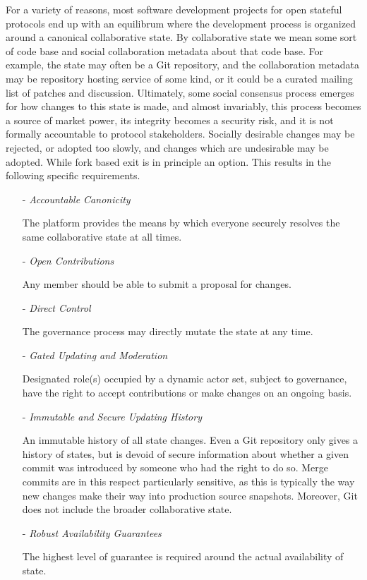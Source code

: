 \documentclass{article}
\begin{document}
For a variety of reasons, most software development projects for open stateful protocols end up with an equilibrum where the development process is organized around a canonical collaborative state. By collaborative state we mean some sort of code base and social collaboration metadata about that code base. For example, the state may often be a Git repository, and the collaboration metadata may be repository hosting service of some kind, or it could be a curated mailing list of patches and discussion. Ultimately, some social consensus process emerges for how changes to this state is made, and almost invariably, this process becomes a source of market power, its integrity becomes a security risk, and it is not formally accountable to protocol stakeholders. Socially desirable changes may be rejected, or adopted too slowly, and changes which are undesirable may be adopted. While fork based exit is in principle an option. This results in the following specific requirements.

\begin{enumerate}

    \item[-] \textit{Accountable Canonicity}

    The platform provides the means by which everyone securely resolves the same collaborative state at all times.

    \item[-] \textit{Open Contributions}

    Any member should be able to submit a proposal for changes.

    \item[-] \textit{Direct Control}

    The governance process may directly mutate the state at any time.

    \item[-] \textit{Gated Updating and Moderation}

    Designated role(s) occupied by a dynamic actor set, subject to governance, have the right to accept contributions or make changes on an ongoing basis.

    \item[-] \textit{Immutable and Secure Updating History}

    An immutable history of all state changes. Even a Git repository only gives a history of states, but is devoid of secure information about whether a given commit was introduced by someone who had the right to do so. Merge commits are in this respect particularly sensitive, as this is typically the way new changes make their way into production source snapshots. Moreover, Git does not include the broader collaborative state.

    \item[-] \textit{Robust Availability Guarantees}

    The highest level of guarantee is required around the actual availability of state.

\end{enumerate}
\end{document}
